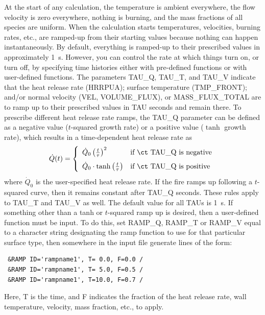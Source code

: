 \documentclass[11pt]{book}
\begin{document}
At the start of any calculation, the temperature is ambient
everywhere, the flow velocity is zero everywhere, nothing is burning,
and the mass fractions of all species are uniform.  When the
calculation starts temperatures, velocities, burning rates,
etc., are ramped-up from their starting values because nothing can
happen instantaneously. By default, everything is ramped-up to their
prescribed values in approximately 1~s. However, you can control the rate at which
things turn on, or turn off, by specifying time histories either with
pre-defined functions or with user-defined functions.  The parameters {\ct
TAU\_Q}, {\ct TAU\_T}, and {\ct TAU\_V} indicate that the heat release
rate ({\ct HRRPUA}); surface temperature ({\ct TMP\_FRONT}); and/or
normal velocity ({\ct VEL}, {\ct VOLUME\_FLUX}), or {\ct
MASS\_FLUX\_TOTAL} are to ramp up to their prescribed values in {\ct
TAU} seconds and remain there. To prescribe different heat release rate ramps, the
{\ct TAU\_Q} parameter can be defined as a negative value ($t$-squared growth rate) or
a positive value ($\tanh$ growth rate), which results in a time-dependent
heat release rate as
\begin{equation}
\dot Q(t) = \left\{ \begin{array}{ll} \dot Q_0 \left( \frac{t}{\tau} \right)^2            &  \mbox{if {\ct TAU\_Q} is negative} \\[.1in]
                                      \dot Q_0 \cdot \tanh \left( \frac{t}{\tau} \right)  &  \mbox{if {\ct TAU\_Q} is positive}  \end{array} \right.
\end{equation}
where $\dot Q_0$ is the user-specified heat release rate. If the
fire ramps up following a $t$-squared curve, then it remains constant after
{\ct TAU\_Q} seconds.  These rules apply to {\ct TAU\_T} and {\ct TAU\_V} as well.
The default value for all {\ct TAU}s is 1~s.  If something other than a tanh or
$t$-squared ramp up is desired, then a user-defined function must be input. To
do this, set {\ct RAMP\_Q}, {\ct RAMP\_T} or {\ct RAMP\_V} equal to a
character string designating the ramp function to use for that
particular surface type, then somewhere in the input file generate
lines of the form:
\begin{lstlisting}
 &RAMP ID='rampname1', T= 0.0, F=0.0 /
 &RAMP ID='rampname1', T= 5.0, F=0.5 /
 &RAMP ID='rampname1', T=10.0, F=0.7 /
\end{lstlisting}
Here, {\ct T} is the time, and {\ct F} indicates the fraction of the heat
release rate, wall temperature, velocity, mass fraction, etc., to apply.
\end{document}

